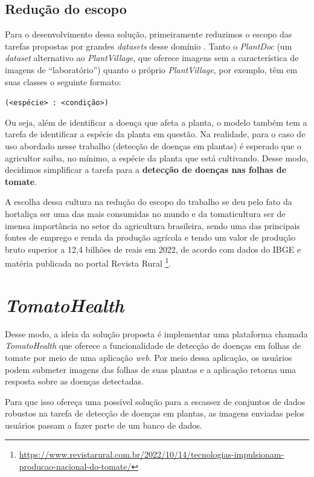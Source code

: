 \subsection{Redução do escopo}
Para o desenvolvimento dessa solução, primeiramente reduzimos o escopo das tarefas propostas por grandes \emph{datasets} desse domínio \citep{Yao2023}. Tanto o \emph{PlantDoc} (um \emph{dataset} alternativo ao \emph{PlantVillage}, que oferece imagens sem a característica de imagens de ``laboratório'') quanto o próprio \emph{PlantVillage}, por exemplo, têm em suas classes o seguinte formato:
\begin{center}
    \texttt{(<espécie> : <condição>)}
\end{center}
Ou seja, além de identificar a doença que afeta a planta, o modelo também tem a tarefa de identificar a espécie da planta em questão. Na realidade, para o caso de uso abordado nesse trabalho (detecção de doenças em plantas) é esperado que o agricultor saiba, no mínimo, a espécie da planta que está cultivando. Desse modo, decidimos simplificar a tarefa para a {\bf detecção de doenças nas folhas de tomate}.

A escolha dessa cultura na redução do escopo do trabalho se deu pelo fato da hortaliça ser uma das mais consumidas no mundo e da tomaticultura ser de imensa importância no setor da agricultura brasileira, sendo uma das principais fontes de emprego e renda da produção agrícola e tendo um valor de produção bruto superior a 12,4 bilhões de reais em 2022, de acordo com dados do IBGE e matéria publicada no portal Revista Rural \footnote{\url{https://www.revistarural.com.br/2022/10/14/tecnologias-impulsionam-producao-nacional-do-tomate/}}.

\section{\emph{TomatoHealth}}
Desse modo, a ideia da solução proposta é implementar uma plataforma chamada \emph{TomatoHealth} que oferece a funcionalidade de detecção de doenças em folhas de tomate por meio de uma aplicação \emph{web}. Por meio dessa aplicação, os usuários podem submeter imagens das folhas de suas plantas e a aplicação retorna uma resposta sobre as doenças detectadas.

Para que isso ofereça uma possível solução para a escassez de conjuntos de dados robustos na tarefa de detecção de doenças em plantas, as imagens enviadas pelos usuários passam a fazer parte de um banco de dados. 

